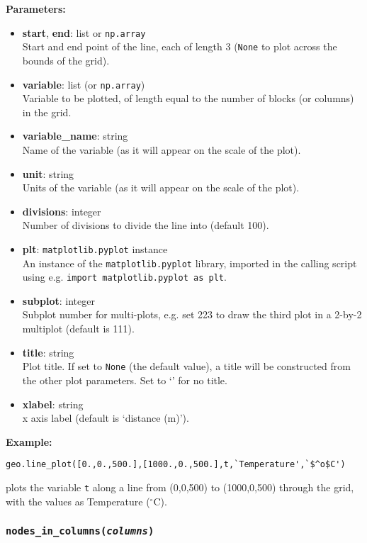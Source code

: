 \textbf{Parameters:}
\begin{itemize}
\item \textbf{start}, \textbf{end}: list or \texttt{np.array}\\
  Start and end point of the line, each of length 3 (\texttt{None} to plot across the bounds of the grid).
\item \textbf{variable}: list (or \texttt{np.array})\\
  Variable to be plotted, of length equal to the number of blocks (or columns) in the grid.
\item \textbf{variable\_name}: string\\
  Name of the variable (as it will appear on the scale of the plot).
\item \textbf{unit}: string\\
  Units of the variable (as it will appear on the scale of the plot).
\item \textbf{divisions}: integer\\
  Number of divisions to divide the line into (default 100).
\item \textbf{plt}: \texttt{matplotlib.pyplot} instance\\
  An instance of the \texttt{matplotlib.pyplot} library, imported in the calling script using e.g. \texttt{import matplotlib.pyplot as plt}.
\item \textbf{subplot}: integer\\
  Subplot number for multi-plots, e.g. set 223 to draw the third plot in a 2-by-2 multiplot (default is 111).
\item \textbf{title}: string\\
  Plot title.  If set to \texttt{None} (the default value), a title will be constructed from the other plot parameters.  Set to `' for no title.
\item \textbf{xlabel}: string\\
  x axis label (default is `distance (m)').
\end{itemize}

\textbf{Example:}

\begin{verbatim}
geo.line_plot([0.,0.,500.],[1000.,0.,500.],t,`Temperature',`$^o$C')
\end{verbatim}

plots the variable \texttt{t} along a line from (0,0,500) to (1000,0,500) through the grid, with the values as Temperature ($^{\circ}$C).

\subsubsection{\texttt{nodes\_in\_columns(\emph{columns})}}

